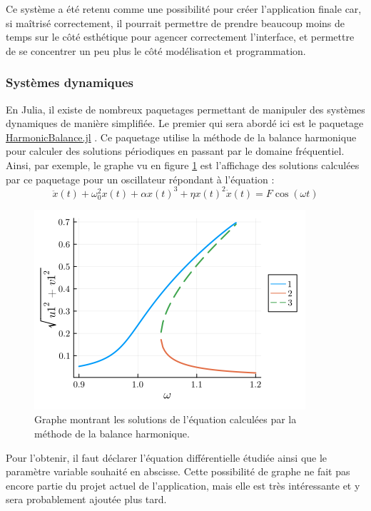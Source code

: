 \documentclass[a4paper, french, 12pt, titlepage]{article}
\begin{document}
Ce système a été retenu comme une possibilité pour créer l'application finale car, si maîtrisé correctement, il pourrait permettre de prendre beaucoup moins de temps sur le côté esthétique pour agencer correctement l'interface, et permettre de se concentrer un peu plus le côté modélisation et programmation.  

\subsubsection{Systèmes dynamiques}

En Julia, il existe de nombreux paquetages permettant de manipuler des systèmes dynamiques de manière simplifiée.
Le premier qui sera abordé ici est le paquetage \href{https://nonlinearoscillations.github.io/HarmonicBalance.jl/stable/}{HarmonicBalance.jl} \cite{kovsata2022harmonicbalance}.
Ce paquetage utilise la méthode de la balance harmonique pour calculer des solutions périodiques en passant par le domaine fréquentiel.
Ainsi, par exemple, le graphe vu en figure \ref{fig:fig8} est l'affichage des solutions calculées par ce paquetage pour un oscillateur répondant à l'équation :
\begin{equation}
\ddot x(t) + \omega_0^2 x(t) + \alpha x(t)^3 + \eta x(t)^2 \dot x (t) = F \cos(\omega t)
\end{equation}

\begin{figure}[H]
  \begin{center}
    \includegraphics[width=0.45\linewidth]{harmonicbalance.png}
    \caption{Graphe montrant les solutions de l'équation calculées par la méthode de la balance harmonique.}
    \label{fig:fig8}
  \end{center}
\end{figure}

Pour l'obtenir, il faut déclarer l'équation différentielle étudiée ainsi que le paramètre variable souhaité en abscisse. Cette possibilité de graphe ne fait pas encore partie du projet actuel de l'application, mais elle est très intéressante et y sera probablement ajoutée plus tard.
\end{document}
